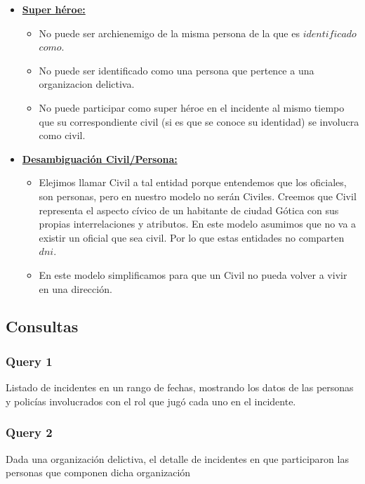 \begin{itemize}
\item\uline{\textbf{Super héroe:}}
\begin{itemize}
\item No puede ser archienemigo de la misma persona de la que es $identificado$ $como$.
\item No puede ser identificado como una persona que pertence a una organizacion delictiva.
\item No puede participar como super héroe en el incidente al mismo tiempo que su correspondiente civil (si es que se conoce su identidad) se involucra como civil.
\end{itemize}
\item\uline{\textbf{Desambiguación Civil/Persona:}}
\begin{itemize}
\item  Elejimos llamar Civil a tal entidad porque entendemos que los oficiales, son personas, pero en nuestro modelo no serán Civiles. Creemos que Civil representa el aspecto cívico de un habitante de ciudad Gótica con sus propias interrelaciones y atributos.
En este modelo asumimos que no va a existir un oficial que sea civil. Por lo que estas entidades no comparten $dni$.
\item En este modelo simplificamos para que un Civil no pueda volver a vivir en una dirección.

\end{itemize}
\end{itemize}

\subsection{Consultas}

\subsubsection{Query 1}
Listado de incidentes en un rango de fechas, mostrando los datos de las personas y policías involucrados con el rol que jugó cada uno en el incidente.



\subsubsection{Query 2}
Dada una organización delictiva, el detalle de incidentes en que participaron
las personas que componen dicha organización



